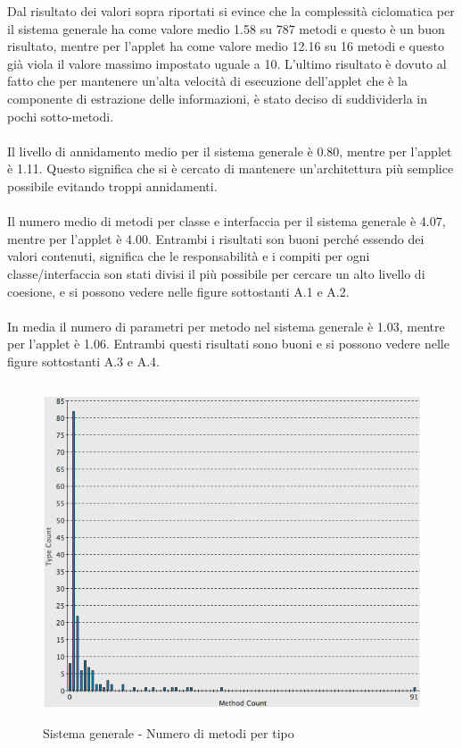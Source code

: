 Dal risultato dei valori sopra riportati si evince che la complessit\`a
ciclomatica per il sistema generale ha come valore medio 1.58 su 787
metodi e questo \`e un buon risultato, mentre per l'applet ha come valore medio
12.16 su 16 metodi e questo gi\`a viola il valore massimo impostato uguale a 10.
L'ultimo risultato \`e dovuto al fatto che per mantenere un'alta velocit\`a di
esecuzione dell'applet che \`e la componente di estrazione delle informazioni,
\`e stato deciso di suddividerla in pochi sotto-metodi. 
\\\\ 
Il livello di
annidamento medio per il sistema generale \`e 0.80, mentre per l'applet \`e
1.11. Questo significa che si \`e cercato di mantenere un'architettura pi\`u
semplice possibile evitando troppi annidamenti. 
\\\\ Il numero medio di metodi
per classe e interfaccia per il sistema generale \`e 4.07, mentre per l'applet
\`e 4.00. Entrambi i risultati son buoni perch\'e essendo dei valori contenuti, significa che le responsabilit\`a e i compiti per
ogni classe/interfaccia son stati divisi il pi\`u possibile per cercare un alto
livello di coesione, e si possono vedere nelle figure sottostanti A.1 e A.2.
\\\\
In media il numero di parametri per metodo nel sistema generale \`e 1.03, mentre
per l'applet \`e 1.06. Entrambi questi risultati sono buoni e si possono vedere
nelle figure sottostanti A.3 e A.4. 

\vspace{2cm}
\begin{figure}[htbp]
  \centering
  \includegraphics[height=10cm]{img/PQ/NumberOfMethodsPerType.png}
\caption{Sistema generale - Numero di metodi per tipo}
\end{figure}


